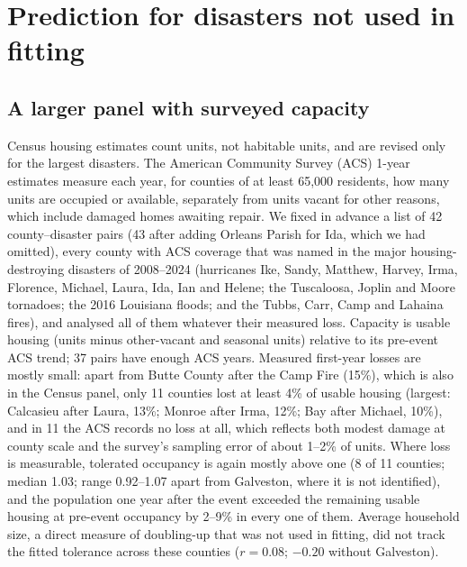 \documentclass[11pt]{article}
\begin{document}
\section{Prediction for disasters not used in fitting}\label{sec:holdout}

\subsection{A larger panel with surveyed capacity}
Census housing estimates count units, not habitable units, and are revised only for the largest disasters. The American Community Survey (ACS) 1-year estimates measure each year, for counties of at least 65{,}000 residents, how many units are occupied or available, separately from units vacant for other reasons, which include damaged homes awaiting repair. We fixed in advance a list of 42 county--disaster pairs (43 after adding Orleans Parish for Ida, which we had omitted), every county with ACS coverage that was named in the major housing-destroying disasters of 2008--2024 (hurricanes Ike, Sandy, Matthew, Harvey, Irma, Florence, Michael, Laura, Ida, Ian and Helene; the Tuscaloosa, Joplin and Moore tornadoes; the 2016 Louisiana floods; and the Tubbs, Carr, Camp and Lahaina fires), and analysed all of them whatever their measured loss. Capacity is usable housing (units minus other-vacant and seasonal units) relative to its pre-event ACS trend; 37 pairs have enough ACS years. Measured first-year losses are mostly small: apart from Butte County after the Camp Fire (15\%), which is also in the Census panel, only 11 counties lost at least 4\% of usable housing (largest: Calcasieu after Laura, 13\%; Monroe after Irma, 12\%; Bay after Michael, 10\%), and in 11 the ACS records no loss at all, which reflects both modest damage at county scale and the survey's sampling error of about 1--2\% of units. Where loss is measurable, tolerated occupancy is again mostly above one (8 of 11 counties; median 1.03; range 0.92--1.07 apart from Galveston, where it is not identified), and the population one year after the event exceeded the remaining usable housing at pre-event occupancy by 2--9\% in every one of them. Average household size, a direct measure of doubling-up that was not used in fitting, did not track the fitted tolerance across these counties ($r=0.08$; $-0.20$ without Galveston).
\end{document}
